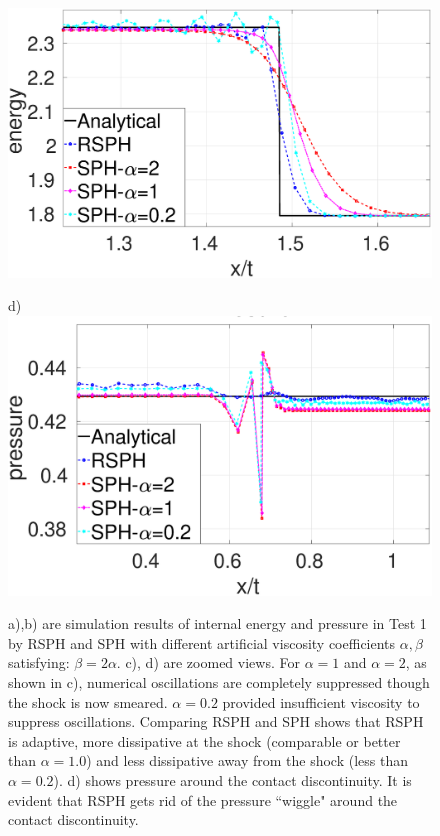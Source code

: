 \begin{figure}
\begin{minipage}{.495 \textwidth}
        \includegraphics[width=0.99 \textwidth, height=0.7\textwidth]{./Chapter-4/Figures/Sod/RCM-Sod-SPH-alf-e-zoom}
    \end{minipage}%
    \begin{minipage}{.495\textwidth}
        \centering d)
        \includegraphics[width=0.99 \textwidth, height=0.7\textwidth]{./Chapter-4/Figures/Sod/RCM-Sod-SPH-alf-p-zoom}
    \end{minipage}%
    \caption{
    a),b) are simulation results of internal energy and pressure in Test 1 by RSPH and SPH with different artificial viscosity coefficients $\alpha,\beta$ satisfying: $\beta=2\alpha$.  c), d) are zoomed views.  For $\alpha=1$ and $\alpha=2$, as shown in c), numerical oscillations are completely suppressed though the shock is now smeared. $\alpha=0.2$ provided insufficient viscosity to suppress oscillations. Comparing RSPH and SPH shows that RSPH is adaptive, more dissipative at the shock (comparable or better than $\alpha=1.0$) and less dissipative away from the shock (less than $\alpha=0.2$). d) shows pressure around the contact discontinuity. It is evident that RSPH gets rid of the pressure ``wiggle" around the contact discontinuity.}
    \label{fig:RCM-Sod-SPH-alf-zoom}
\end{figure}

